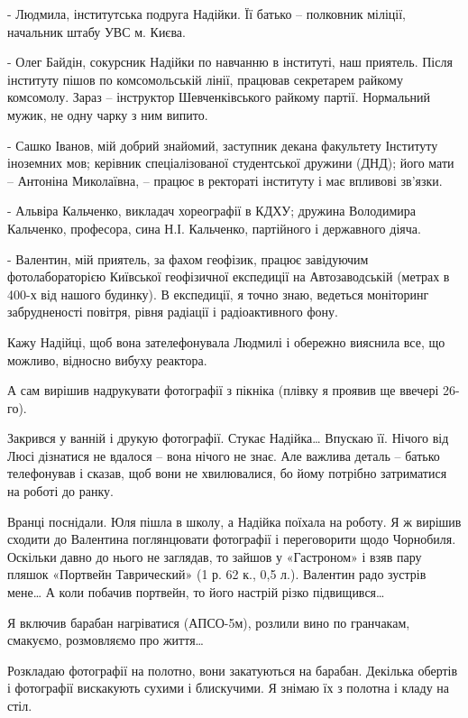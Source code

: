 - Людмила, інститутська подруга Надійки. Її батько – полковник міліції,
начальник штабу УВС м. Києва.

- Олег Байдін, сокурсник Надійки по навчанню в інституті, наш приятель. Після
інституту пішов по комсомольській лінії, працював секретарем райкому комсомолу.
Зараз – інструктор Шевченківського райкому партії. Нормальний мужик, не одну
чарку з ним випито. 

- Сашко Іванов, мій добрий знайомий, заступник декана факультету Інституту
іноземних мов; керівник спеціалізованої студентської дружини (ДНД); його мати –
Антоніна Миколаївна, – працює в ректораті інституту і має впливові зв’язки.

- Альвіра Кальченко, викладач хореографії в КДХУ; дружина Володимира Кальченко,
професора, сина Н.І. Кальченко, партійного і державного діяча.

- Валентин, мій приятель, за фахом геофізик, працює завідуючим фотолабораторією
Київської геофізичної експедиції на Автозаводській (метрах в 400-х від нашого
будинку). В експедиції, я точно знаю, ведеться моніторинг забрудненості
повітря, рівня радіації і радіоактивного фону.

Кажу Надійці, щоб вона зателефонувала Людмилі і обережно вияснила все, що
можливо, відносно вибуху реактора. 

А сам вирішив надрукувати фотографії з пікніка (плівку я проявив ще ввечері
26-го).

Закрився у ванній і друкую фотографії. Стукає Надійка… Впускаю її. Нічого від
Люсі дізнатися не вдалося – вона нічого не знає. Але важлива деталь – батько
телефонував і сказав, щоб вони не хвилювалися, бо йому потрібно затриматися на
роботі до ранку. 


Вранці поснідали. Юля пішла в школу, а Надійка поїхала на роботу. Я ж вирішив
сходити до Валентина поглянцювати фотографії і переговорити щодо Чорнобиля.
Оскільки давно до нього не заглядав, то зайшов у «Гастроном» і взяв пару пляшок
«Портвейн Таврический» (1 р. 62 к., 0,5 л.). Валентин радо зустрів мене… А коли
побачив портвейн, то його настрій різко підвищився… 

Я включив барабан нагріватися (АПСО-5м), розлили вино по гранчакам, смакуємо,
розмовляємо про життя… 

Розкладаю фотографії на полотно, вони закатуються на барабан. Декілька обертів
і фотографії вискакують сухими і блискучими. Я знімаю їх з полотна і кладу на
стіл. 

